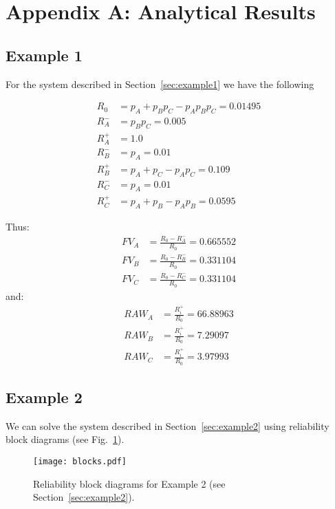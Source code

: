 \section*{Appendix A: Analytical Results}
\label{sec:appendixA}

\subsection*{Example 1}
\label{sec:example1Anal}

For the system described in Section~\ref{sec:example1} we have the following

\begin{align} 
  R_0   &= p_A + p_B p_C - p_A p_B p_C = 0.01495   \\
  R_A^- &= p_B p_C = 0.005  \\
  R_A^+ &= 1.0  \\
  R_B^- &= p_A = 0.01  \\
  R_B^+ &= p_A + p_C - p_A p_C = 0.109  \\
  R_C^- &= p_A = 0.01 \\
  R_C^+ &= p_A + p_B - p_A p_B = 0.0595  
\end{align}

Thus:
\begin{align} 
  FV_A &= \frac{R_0-R_A^-}{R_0} = 0.665552 \\
  FV_B &= \frac{R_0-R_B^-}{R_0} = 0.331104 \\
  FV_C &= \frac{R_0-R_C^-}{R_0} = 0.331104    
\end{align}
and:
\begin{align} 
  RAW_A &= \frac{R_i^+}{R_0} = 66.88963 \\
  RAW_B &= \frac{R_i^+}{R_0} = 7.29097 \\
  RAW_C &= \frac{R_i^+}{R_0} = 3.97993    
\end{align}

\subsection*{Example 2}
\label{sec:example2Anal}

We can solve the system described in Section~\ref{sec:example2} using reliability
block diagrams (see Fig.~\ref{fig:example2RBB}).

\begin{figure}
    \centering
    \texttt{[image: blocks.pdf]}
    \caption{Reliability block diagrams for Example 2 (see Section~\ref{sec:example2}).}
    \label{fig:example2RBB}
\end{figure}

